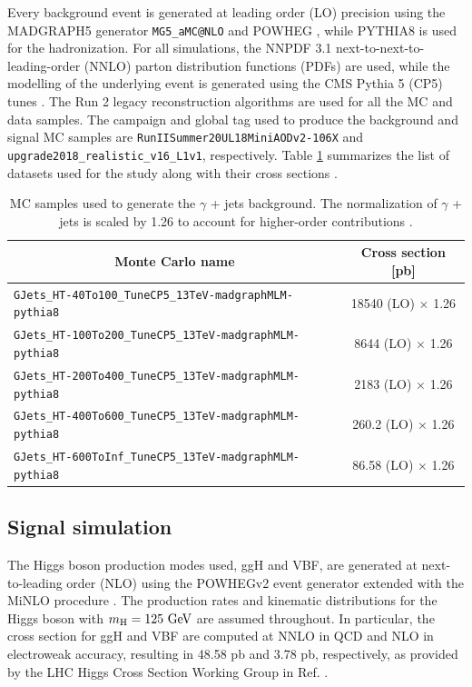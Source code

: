 Every background event is generated at leading order (LO) precision using the MADGRAPH5 generator \verb+MG5_aMC@NLO+ \cite{Alwall:2014hca} and POWHEG \cite{Alioli:2010xd}, while PYTHIA8 \cite{Sjostrand:2014zea} is used for the hadronization. For all simulations, the NNPDF 3.1 \cite{NNPDF:2017mvq} next-to-next-to-leading-order (NNLO) parton distribution functions (PDFs) are used, while the modelling of the underlying event is generated using the CMS Pythia 5 (CP5) tunes \cite{CMS:2019csb}. The Run 2 legacy reconstruction algorithms \cite{Elmetenawee:2020emw} are used for all the MC and data samples. The campaign and global tag used to produce the background and signal MC samples are \verb+RunIISummer20UL18MiniAODv2-106X+ and \verb+upgrade2018_realistic_v16_L1v1+, respectively. Table \ref{tab:MC_samples} summarizes the list of datasets used for the study along with their cross sections \cite{CERN:xsdb}.

\begin{table}[ht]
    \centering
    \begin{tabular}{|l|c|}
        \hline
        \multicolumn{1}{|c|}{\cellcolor{lightgray}Monte Carlo name} & \cellcolor{lightgray}Cross section [pb] \\ \hline
        \verb+GJets_HT-40To100_TuneCP5_13TeV-madgraphMLM-pythia8+  & 18540 (LO) $\times$ 1.26 \\
        \verb+GJets_HT-100To200_TuneCP5_13TeV-madgraphMLM-pythia8+  & 8644 (LO) $\times$ 1.26 \\
        \verb+GJets_HT-200To400_TuneCP5_13TeV-madgraphMLM-pythia8+  & 2183 (LO) $\times$ 1.26 \\
        \verb+GJets_HT-400To600_TuneCP5_13TeV-madgraphMLM-pythia8+  & 260.2 (LO) $\times$ 1.26 \\
        \verb+GJets_HT-600ToInf_TuneCP5_13TeV-madgraphMLM-pythia8+  & 86.58 (LO) $\times$ 1.26 \\ \hline
    \end{tabular}
    \caption{MC samples used to generate the $\gamma$ + jets background. The normalization of $\gamma$ + jets is scaled by 1.26 to account for higher-order contributions \cite{CMS:2018qao}.}
    \label{tab:MC_samples}
\end{table}

\subsection{Signal simulation}

The Higgs boson production modes used, ggH and VBF, are generated at next-to-leading order (NLO) using the POWHEGv2 event generator extended with the MiNLO procedure \cite{Hamilton:2012np}. The production rates and kinematic distributions for the Higgs boson with $m_\text{H}=125\ \text{GeV}$ are assumed throughout. In particular, the cross section for ggH and VBF are computed at NNLO in QCD and NLO in electroweak accuracy, resulting in 48.58 pb and 3.78 pb, respectively, as provided by the LHC Higgs Cross Section Working Group in Ref. \cite{LHCHiggsCrossSectionWorkingGroup:2016ypw}.

